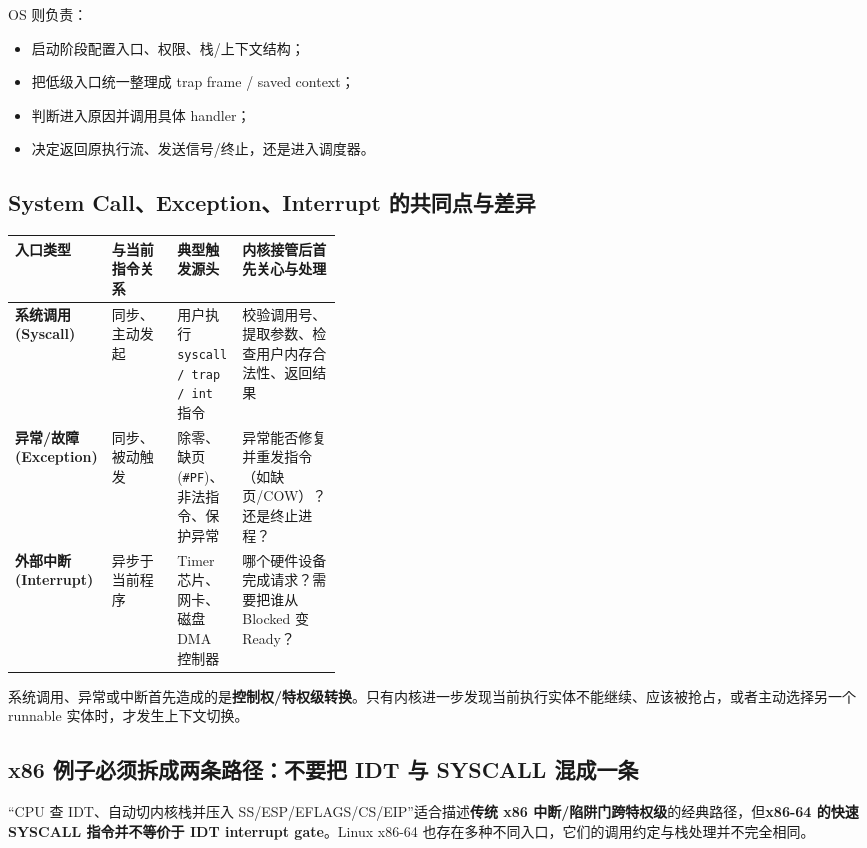 \documentclass[11pt,a4paper]{ctexart}
\newcommand{\kw}[1]{\textbf{#1}}
\newcommand{\code}[1]{\texttt{#1}}
\begin{document}
OS 则负责：
\begin{itemize}
  \item 启动阶段配置入口、权限、栈/上下文结构；
  \item 把低级入口统一整理成 trap frame / saved context；
  \item 判断进入原因并调用具体 handler；
  \item 决定返回原执行流、发送信号/终止，还是进入调度器。
\end{itemize}

\subsection{System Call、Exception、Interrupt 的共同点与差异}

\begingroup
\small
\renewcommand{\arraystretch}{1.25}
\setlength{\tabcolsep}{6pt}
\begin{tabularx}{\linewidth}{>{\bfseries}p{0.18\linewidth} p{0.2\linewidth} X X}
\toprule
入口类型 & 与当前指令关系 & 典型触发源头 & 内核接管后首先关心与处理\\
\midrule
系统调用 (Syscall) & 同步、主动发起 & 用户执行 \code{syscall / trap / int} 指令 & 校验调用号、提取参数、检查用户内存合法性、返回结果\\
异常/故障 (Exception) & 同步、被动触发 & 除零、缺页 (\code{\#PF})、非法指令、保护异常 & 异常能否修复并重发指令（如缺页/COW）？还是终止进程？\\
外部中断 (Interrupt) & 异步于当前程序 & Timer 芯片、网卡、磁盘 DMA 控制器 & 哪个硬件设备完成请求？需要把谁从 Blocked 变 Ready？\\
\bottomrule
\end{tabularx}
\endgroup

\begin{exam}[408 核心：进入内核态不等于上下文切换]
系统调用、异常或中断首先造成的是\kw{控制权/特权级转换}。只有内核进一步发现当前执行实体不能继续、应该被抢占，或者主动选择另一个 runnable 实体时，才发生上下文切换。
\end{exam}

\subsection{x86 例子必须拆成两条路径：不要把 IDT 与 SYSCALL 混成一条}
\begin{warn}
“CPU 查 IDT、自动切内核栈并压入 SS/ESP/EFLAGS/CS/EIP”适合描述\kw{传统 x86 中断/陷阱门跨特权级}的经典路径，但\kw{x86-64 的快速 SYSCALL 指令并不等价于 IDT interrupt gate}。Linux x86-64 也存在多种不同入口，它们的调用约定与栈处理并不完全相同。
\end{warn}
\end{document}
